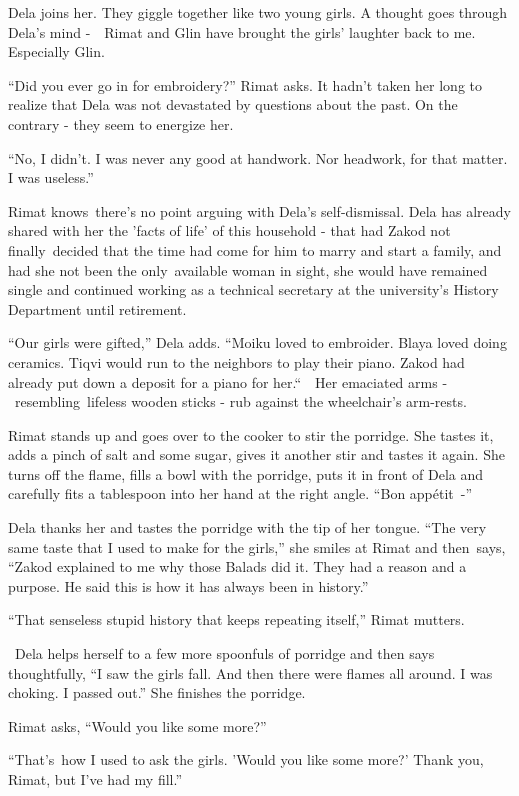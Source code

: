\documentclass[twoside,11pt]{book}
\begin{document}
Dela joins her. They giggle together like two young girls. A thought goes through Dela's mind -\ \ Rimat and Glin have
brought the girls' laughter back to me. Especially Glin. 

``Did you ever go in for embroidery?'' Rimat asks. It hadn't taken her long to realize that
Dela was not devastated by questions about the past. On the contrary - they seem to energize her. 

``No, I didn't. I was never any good at handwork. Nor headwork, for that matter. I was
useless.'' 

Rimat knows~there's no point arguing with Dela's self-dismissal. Dela has already shared with her the 'facts of life' of
this household -  that had Zakod not finally~decided that the time had come for him to marry and start a family, and
had she not been the only~available woman in sight, she would have remained single and continued working as a technical
secretary at the university's History Department until retirement.\ 

``Our girls were gifted,'' Dela adds. ``Moiku loved to embroider. Blaya loved
doing ceramics. Tiqvi would run to the neighbors to play their piano. Zakod had already put down a deposit for a piano
for her.``\ \ Her emaciated arms -\ resembling\ lifeless wooden sticks - rub against the wheelchair's
arm-rests. 

Rimat stands up and goes over to the cooker to stir the porridge. She tastes it, adds a pinch of salt and some sugar,
gives it another stir and tastes it again. She turns off the flame, fills a bowl with the porridge, puts it in front of
Dela and carefully fits a tablespoon into her hand at the right angle. ``Bon app\'etit\ {}-''


Dela thanks her and tastes the porridge with the tip of her tongue. ``The very same taste that I used to
make for the girls,'' she smiles at Rimat and then\ says, ``Zakod explained to me why those
Balads did it. They had a reason and a purpose. He said this is how it has always been in history.'' \ 

``That senseless stupid history that keeps repeating itself,'' Rimat mutters.

~Dela helps herself to a few more spoonfuls of porridge and then says thoughtfully, ``I saw the girls fall.
And then there were flames all around. I was choking. I passed out.'' She finishes the porridge.

Rimat asks, ``Would you like some more?'' 

``That's~how I used to ask the girls. 'Would you like some more?' Thank you, Rimat, but I've had my
fill.'' 
\end{document}
